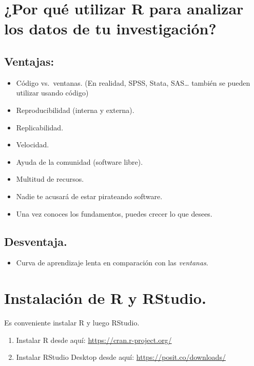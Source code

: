 \documentclass[
  letterpaper,
  DIV=11,
  numbers=noendperiod]{scrreprt}
\providecommand{\tightlist}{%
  \setlength{\itemsep}{0pt}\setlength{\parskip}{0pt}}\usepackage{longtable,booktabs,array}
\begin{document}
\hypertarget{por-quuxe9-utilizar-r-para-analizar-los-datos-de-tu-investigaciuxf3n}{%
\section{¿Por qué utilizar R para analizar los datos de tu
investigación?}\label{por-quuxe9-utilizar-r-para-analizar-los-datos-de-tu-investigaciuxf3n}}

\hypertarget{ventajas}{%
\subsection{Ventajas:}\label{ventajas}}

\begin{itemize}
\tightlist
\item
  Código vs.~ventanas. (En realidad, SPSS, Stata, SAS\ldots{} también se
  pueden utilizar usando código)
\item
  Reproducibilidad (interna y externa).
\item
  Replicabilidad.
\item
  Velocidad.
\item
  Ayuda de la comunidad (software libre).
\item
  Multitud de recursos.
\item
  Nadie te acusará de estar pirateando software.
\item
  Una vez conoces los fundamentos, puedes crecer lo que desees.
\end{itemize}

\hypertarget{desventaja.}{%
\subsection{Desventaja.}\label{desventaja.}}

\begin{itemize}
\tightlist
\item
  Curva de aprendizaje lenta en comparación con las \emph{ventanas}.
\end{itemize}

\hypertarget{instalaciuxf3n-de-r-y-rstudio.}{%
\section{Instalación de R y
RStudio.}\label{instalaciuxf3n-de-r-y-rstudio.}}

Es conveniente instalar R y luego RStudio.

\begin{enumerate}
\def\labelenumi{\arabic{enumi}.}
\tightlist
\item
  Instalar R desde aquí: \url{https://cran.r-project.org/}
\item
  Instalar RStudio Desktop desde aquí: \url{https://posit.co/downloads/}
\end{enumerate}
\end{document}
